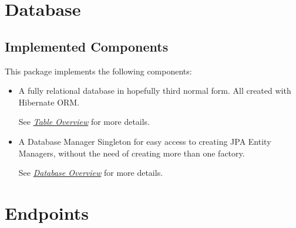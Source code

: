 \documentclass[12pt, twoside, a4paper]{report}
\begin{document}
\section*{Database}\label{sec:database}
\subsection*{Implemented Components}
This package implements the following components:
\begin{itemize}
  \item A fully relational database in hopefully third normal form. All created with Hibernate ORM.

    See \textit{\href{run:../JavaDoc/database/tables/package-summary.html}{Table Overview}} for more details.
  \item A Database Manager Singleton for easy access to creating JPA Entity Managers, without the need of creating more than one factory.

    See \textit{\href{run:../JavaDoc/database/package-summary.html}{Database Overview}} for more details.
\end{itemize}

\section*{Endpoints}\label{sec:endpoints}
\end{document}
